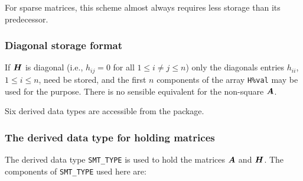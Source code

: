 \documentclass{galahad}
\begin{document}
For sparse matrices, this scheme almost always requires less storage than 
its predecessor.

\subsubsection{Diagonal storage format}\label{diagonal}
If ${\bm{H}}$ is diagonal (i.e., $h_{ij} = 0$ for all $1 \leq i \neq j \leq n$)
only the diagonals entries $h_{ii}$, $1 \leq i \leq n$,  need be stored,
and the first $n$ components of the array {\tt H\%val} may be used for 
the purpose. There is no sensible equivalent for the non-square ${\bm{A}}$.





\galtypes
Six derived data types are accessible from the package.


\subsubsection{The derived data type for holding matrices}\label{typesmt}
The derived data type {\tt SMT\_TYPE} is used to hold the matrices ${\bm{A}}$
and ${\bm{H}}$. The components of {\tt SMT\_TYPE} used here are:
\end{document}
